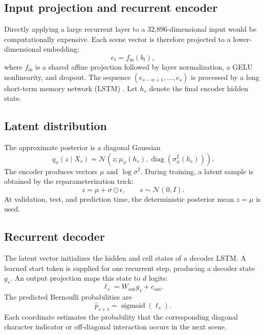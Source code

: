 \documentclass[11pt]{article}
\begin{document}
\subsection{Input projection and recurrent encoder}

Directly applying a large recurrent layer to a 32,896-dimensional input would be computationally expensive. Each scene vector is therefore projected to a lower-dimensional embedding:
\begin{equation}
  e_t=f_{\mathrm{in}}(b_t),
\end{equation}
where $f_{\mathrm{in}}$ is a shared affine projection followed by layer normalization, a GELU nonlinearity, and dropout. The sequence $(e_{s-w+1},\ldots,e_s)$ is processed by a long short-term memory network (LSTM) \cite{hochreiter1997lstm}. Let $h_s$ denote the final encoder hidden state.

\subsection{Latent distribution}

The approximate posterior is a diagonal Gaussian
\begin{equation}
  q_{\phi}(z\mid X_s)
  =\mathcal{N}\!\left(z;\mu_{\phi}(h_s),
  \operatorname{diag}(\sigma_{\phi}^2(h_s))\right).
\end{equation}
The encoder produces vectors $\mu$ and $\log\sigma^2$. During training, a latent sample is obtained by the reparameterization trick:
\begin{equation}
  z=\mu+\sigma\odot\epsilon,
  \qquad \epsilon\sim\mathcal{N}(0,I).
\end{equation}
At validation, test, and prediction time, the deterministic posterior mean $z=\mu$ is used.

\subsection{Recurrent decoder}

The latent vector initializes the hidden and cell states of a decoder LSTM. A learned start token is supplied for one recurrent step, producing a decoder state $g_s$. An output projection maps this state to $d$ logits:
\begin{equation}
  \ell_s=W_{\mathrm{out}}g_s+c_{\mathrm{out}}.
\end{equation}
The predicted Bernoulli probabilities are
\begin{equation}
  \widehat{p}_{s+1}=\operatorname{sigmoid}(\ell_s).
\end{equation}
Each coordinate estimates the probability that the corresponding diagonal character indicator or off-diagonal interaction occurs in the next scene.
\end{document}
